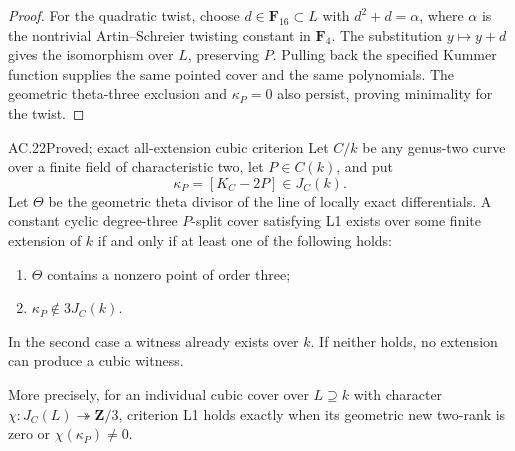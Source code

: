 \begin{proof}
For the quadratic twist, choose $d\in\mathbf F_{16}\subset L$ with
$d^2+d=\alpha$, where $\alpha$ is the nontrivial Artin--Schreier
twisting constant in $\mathbf F_4$.  The substitution $y\mapsto y+d$
gives the isomorphism over $L$, preserving $P$.  Pulling back the
specified Kummer function supplies the same pointed cover and the same
polynomials.  The geometric theta-three exclusion and $\kappa_P=0$
also persist, proving minimality for the twist.
\end{proof}

\begin{claim}{AC.22}{Proved; exact all-extension cubic criterion}
Let $C/k$ be any genus-two curve over a finite field of characteristic
two, let $P\in C(k)$, and put
\[
                       \kappa_P=[K_C-2P]\in J_C(k).
\]
Let $\Theta$ be the geometric theta divisor of the line of locally
exact differentials.  A constant cyclic degree-three $P$-split cover
satisfying L1 exists over some finite extension of $k$ if and only if
at least one of the following holds:
\begin{enumerate}
\item $\Theta$ contains a nonzero point of order three;
\item $\kappa_P\notin3J_C(k)$.
\end{enumerate}
In the second case a witness already exists over $k$.
If neither holds, no extension can produce a cubic witness.

More precisely, for an individual cubic cover over $L\supseteq k$
with character $\chi:J_C(L)\twoheadrightarrow\mathbf Z/3$, criterion
L1 holds exactly when its geometric new two-rank is zero or
$\chi(\kappa_P)\ne0$.
\end{claim}

